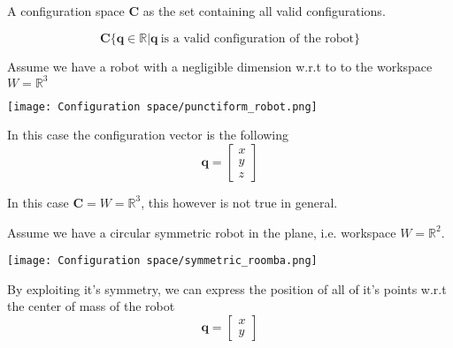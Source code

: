 \begin{definition}
    A configuration space $\mathbf{C}$ as the set containing all valid configurations.

    $$
        \mathbf{C}  \{\bm{q} \in \mathbb{R} | \bm{q} \ \text{is a valid configuration of the robot}\}
    $$
\end{definition}

\begin{example}
    Assume we have a robot with a negligible dimension w.r.t to to the workspace $W = \mathbb{R}^3$
    \begin{center}
        \texttt{[image: Configuration space/punctiform\_robot.png]}
    \end{center}


    In this case the configuration vector is the following
    $$
        \bm{q} = \begin{bmatrix}
            x \\
            y \\
            z
        \end{bmatrix}
    $$
    \begin{tipbox}[Tip]
        In this case $\mathbf{C} = W = \mathbb{R}^3$, this however is not true in general.
    \end{tipbox}
\end{example}

\begin{example}
    Assume we have a circular symmetric robot in the plane, i.e. workspace $W = \mathbb{R}^2$.
    \begin{center}
        \texttt{[image: Configuration space/symmetric\_roomba.png]}
    \end{center}

    By exploiting it's symmetry, we can express the position of all of it's points w.r.t the center of mass of the robot
    $$
        \bm{q} = \begin{bmatrix}
            x \\
            y
        \end{bmatrix}
    $$
\end{example}

